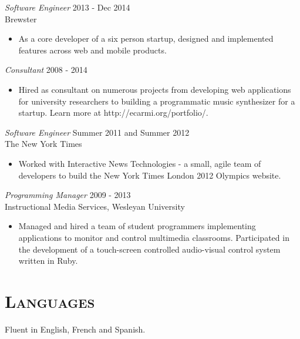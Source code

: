 \documentclass[margin]{res}
\begin{document}
\begin{resume}
    {\sl Software Engineer} \hfill 2013 - Dec 2014 \\ Brewster
    \begin{itemize}  \itemsep -2pt %
        \item As a core developer of a six person startup, designed and implemented features across web and mobile products.
    \end{itemize}

    {\sl Consultant} \hfill 2008 - 2014
    \begin{itemize}  \itemsep -2pt %
        \item Hired as consultant on numerous projects from developing web applications for university researchers to building a programmatic music synthesizer for a startup. Learn more at http://ecarmi.org/portfolio/.
    \end{itemize}

    {\sl Software Engineer} \hfill Summer 2011 and Summer 2012 \\
    The New York Times
    \begin{itemize}  \itemsep -2pt %
        \item Worked with Interactive News Technologies - a small, agile team of developers to build the New York Times London 2012 Olympics website.
    \end{itemize}

    {\sl Programming Manager} \hfill 2009 - 2013 \\
    Instructional Media Services, Wesleyan University
    \begin{itemize}  \itemsep -2pt %
        \item Managed and hired a team of student programmers implementing applications to monitor and control multimedia classrooms. Participated in the development of a touch-screen controlled audio-visual control system written in Ruby.
    \end{itemize}

\section{\textsc{Languages}} Fluent in English, French and Spanish.

\end{resume}
\end{document}
